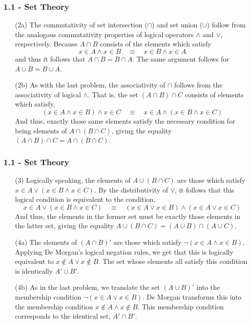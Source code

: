 \documentclass{beamer}
\begin{document}
\begin{frame}
\frametitle{1.1 - Set Theory}
\small
\begin{enumerate}
    \item [(2a)] The commutativity of set intersection ($\cap$) and set union ($\cup$) follow from the analogous commutativity properties of logical operators $\wedge$ and $\vee$, respectively. Because $A\cap B$ consists of the elements which satisfy
    \begin{equation*}
    	x\in A \wedge x\in B \quad\equiv\quad x\in B \wedge x\in A
    \end{equation*}
    and thus it follows that $A\cap B = B\cap A$. The same argument follows for $A \cup B = B\cup A$.
    \item [(2b)] As with the last problem, the associativity of $\cap$ follows from the associativity of logical $\wedge$. That is, the set $(A\cap B)\cap C$ consists of elements which satisfy,
    \begin{equation*}
    	(x\in A \wedge x\in B)\wedge x\in C\quad\equiv\quad x\in A\wedge(x\in B \wedge x\in C)
    \end{equation*}
    And thus, exactly those same elements satisfy the necessary condition for being elements of $A\cap(B\cap C)$, giving the equality $(A\cap B)\cap C = A\cap(B\cap C)$.
\end{enumerate}
\end{frame}
\begin{frame}
\frametitle{1.1 - Set Theory}
\small
\begin{enumerate}
	\item[(3)] Logically speaking, the elements of $A\cup(B\cap C)$ are those which satisfy $x\in A \vee (x\in B \wedge x\in C)$. By the distributivity of $\vee$, it follows that this logical condition is equivalent to the condition,
	\begin{equation*}
		x\in A \vee (x\in B \wedge x\in C)\quad\equiv\quad(x\in A\vee x\in B)\wedge (x\in A \vee x\in C)
	\end{equation*}
	And thus, the elements in the former set must be exactly those elements in the latter set, giving the equality $A\cup(B\cap C) = (A\cup B)\cap(A\cup C)$.
	\item[(4a)] The elements of $(A\cap B)'$ are those which satisfy $\neg(x\in A\wedge x\in B)$. Applying De Morgan's logical negation rules, we get that this is logically equivalent to $x\notin A\vee x\notin B$. The set whose elements all satisfy this condition is identically $A'\cup B'$.
	\item[(4b)] As in the last problem, we translate the set $(A\cup B)'$ into the membership condition $\neg(x\in A \vee x\in B)$. De Morgan transforms this into the membership condition $x\notin A \wedge x\notin B$. This membership condition corresponds to the identical set, $A'\cap B'$.
\end{enumerate}
\end{frame}
\end{document}
